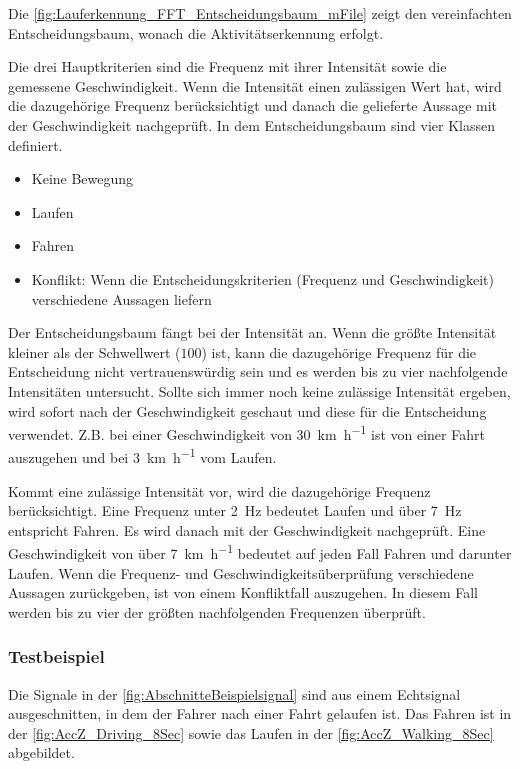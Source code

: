 Die \autoref{fig:Lauferkennung_FFT_Entscheidungsbaum_mFile} zeigt den vereinfachten Entscheidungsbaum, wonach die Aktivitäts\-erkennung erfolgt.

Die drei Hauptkriterien sind die Frequenz mit ihrer Intensität sowie die gemessene Geschwindigkeit. Wenn die Intensität einen zulässigen Wert hat, wird die dazugehörige Frequenz berücksichtigt und danach die gelieferte Aussage mit der Geschwindigkeit nachgeprüft.
In dem Entscheidungsbaum sind vier Klassen definiert.
\begin{itemize}
	\item Keine Bewegung
	\item Laufen
	\item Fahren
	\item Konflikt: Wenn die Entscheidungskriterien (Frequenz und Geschwindigkeit) verschiedene Aussagen liefern
\end{itemize}
Der Entscheidungsbaum fängt bei der Intensität an. Wenn die größte Intensität kleiner als der Schwellwert ($100$) ist, kann die dazugehörige Frequenz für die Entscheidung nicht vertrauenswürdig sein und es werden bis zu vier nachfolgende Intensitäten untersucht. Sollte sich immer noch keine zulässige Intensität ergeben, wird sofort nach der Geschwindigkeit geschaut und diese für die Entscheidung verwendet.
Z.B. bei einer Geschwindigkeit von \SI[per-mode = symbol]{30}{\kilo\meter\per\hour} ist von einer Fahrt auszugehen und bei \SI[per-mode = symbol]{3}{\kilo\meter\per\hour} vom Laufen.

Kommt eine zulässige Intensität vor, wird die dazugehörige Frequenz berücksichtigt. Eine Frequenz unter \SI{2}{\hertz} bedeutet \glqq Laufen\grqq{} und über \SI{7}{\hertz} entspricht \glqq Fahren\grqq{}. Es wird danach mit der Geschwindigkeit nachgeprüft. Eine Geschwindigkeit von über \SI[per-mode = symbol]{7}{\kilo\meter\per\hour} bedeutet auf jeden Fall \glqq Fahren\grqq{} und darunter \glqq Laufen\grqq{}.
Wenn die Frequenz- und Geschwindigkeitsüberprüfung verschiedene Aussagen zurückgeben, ist von einem Konfliktfall auszugehen. In diesem Fall werden bis zu vier der größten nachfolgenden Frequenzen überprüft.


\subsubsection{Testbeispiel}
Die Signale in der \autoref{fig:AbschnitteBeispielsignal} sind aus einem Echtsignal ausgeschnitten, in dem der Fahrer nach einer Fahrt gelaufen ist. Das Fahren ist in der \autoref{fig:AccZ_Driving_8Sec} sowie das Laufen in der \autoref{fig:AccZ_Walking_8Sec} abgebildet.

